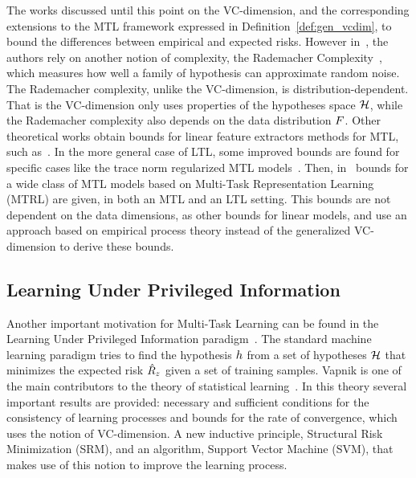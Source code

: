 %
The works discussed until this point on the VC-dimension, and the corresponding extensions to the MTL framework expressed in Definition~\ref{def:gen_vcdim}, to bound the differences between empirical and expected risks.
%
However in~\cite{AndoZ05}, the authors rely on another notion  of complexity, the Rademacher Complexity~\cite{BartlettM02}, which measures how well a family of hypothesis can approximate random noise. The Rademacher complexity, unlike the VC-dimension, is distribution-dependent. That is the VC-dimension only uses properties of the hypotheses space $\mathcal{H}$, while the Rademacher complexity also depends on the data distribution $F$. 
Other theoretical works obtain bounds for linear feature extractors methods for MTL, such as~\cite{CavallantiCG10,Maurer06, Maurer06rad}.
In the more general case of LTL, some improved bounds are found for specific cases like the trace norm regularized MTL models~\cite{MaurerPR13}.
Then, in~\cite{MaurerPR16} bounds for a wide class of MTL models based on Multi-Task Representation Learning (MTRL) are given, in both an MTL and an LTL setting. This bounds are not dependent on the data dimensions, as other bounds for linear models, and use an approach based on empirical process theory instead of the generalized VC-dimension to derive these bounds.


\subsection{Learning Under Privileged Information}\label{subsec:ch3_lupi}
Another important motivation for Multi-Task Learning can be found in the Learning Under Privileged Information paradigm~\cite{VapnikI15a}.
The standard machine learning paradigm tries to find the hypothesis $h$ from a set of hypotheses $\mathcal{H}$ that minimizes the expected risk $\hat{R}_z$ given a set of training samples.
Vapnik is one of the main contributors to the theory of statistical learning~\cite{Vapnik00}. In this theory several important results are provided: necessary and sufficient conditions for the consistency of learning processes and bounds for the rate of convergence, which uses the notion of VC-dimension. A new inductive principle, Structural Risk Minimization (SRM), and an algorithm, Support Vector Machine (SVM), that makes use of this notion to improve the learning process.

